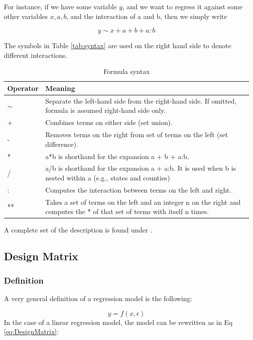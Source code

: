 For instance, if we have some variable $y$, and we want to regress it against some other variables $x, a, b$, and the interaction of a and b, then we simply write

\begin{equation}
    y \sim x + a + b + a:b
\end{equation}

The symbols in Table \ref{tab:syntax} are used on the right hand side to denote different interactions.

\begin{table}
  \centering
  \footnotesize{
  \begin{tabular}{ p{2cm} p{9cm} }
     Operator & Meaning \\
     \hline
    $\sim $ &	Separate the left-hand side from the right-hand side. If omitted, formula is assumed right-hand side only. \\
    + &	Combines terms on either side (set union). \\
    - &	Removes terms on the right from set of terms on the left (set difference). \\
    * &	a*b is shorthand for the expansion a + b + a:b. \\
    / &	a/b is shorthand for the expansion a + a:b. It is used when b is nested within a (e.g., states and counties) \\
    : &	Computes the interaction between terms on the left and right. \\
    ** & Takes a set of terms on the left and an integer n on the right and computes the * of that set of terms with itself n times.\\
     \hline
  \end{tabular}
  }
  \caption{Formula syntax}
\end{table}\label{tab:syntax}

A complete set of the description is found under \cite{patsy}.

\subsection{Design Matrix}

\subsubsection{Definition}
A very general definition of a regression model is the following:

\begin{equation}
  y =f(x,\epsilon)
\end{equation}
In the case of a linear regression model, the model can be rewritten as in Eq \ref{eq:DesignMatrix}:

